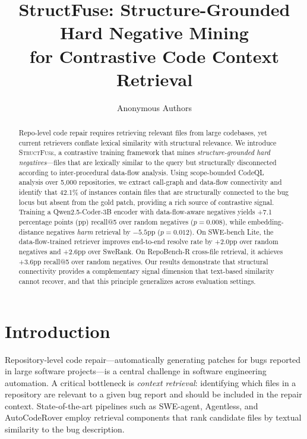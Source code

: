 \documentclass[11pt]{article}
\title{StructFuse: Structure-Grounded Hard Negative Mining\\for Contrastive Code Context Retrieval}
\author{
  Anonymous Authors
}
\date{}
\begin{document}
\maketitle

\begin{abstract}
Repo-level code repair requires retrieving relevant files from large codebases, yet current retrievers conflate lexical similarity with structural relevance.
We introduce \textsc{StructFuse}, a contrastive training framework that mines \emph{structure-grounded hard negatives}---files that are lexically similar to the query but structurally disconnected according to inter-procedural data-flow analysis.
Using scope-bounded CodeQL analysis over 5{,}000 repositories, we extract call-graph and data-flow connectivity and identify that 42.1\% of instances contain files that are structurally connected to the bug locus but absent from the gold patch, providing a rich source of contrastive signal.
Training a Qwen2.5-Coder-3B encoder with data-flow-aware negatives yields +7.1 percentage points (pp) recall@5 over random negatives ($p{=}0.008$), while embedding-distance negatives \emph{harm} retrieval by $-5.5$pp ($p{=}0.012$).
On SWE-bench Lite, the data-flow-trained retriever improves end-to-end resolve rate by +2.0pp over random negatives and +2.6pp over SweRank.
On RepoBench-R cross-file retrieval, it achieves +3.6pp recall@5 over random negatives.
Our results demonstrate that structural connectivity provides a complementary signal dimension that text-based similarity cannot recover, and that this principle generalizes across evaluation settings.
\end{abstract}

\section{Introduction}
\label{sec:intro}

Repository-level code repair---automatically generating patches for bugs reported in large software projects---is a central challenge in software engineering automation.
A critical bottleneck is \emph{context retrieval}: identifying which files in a repository are relevant to a given bug report and should be included in the repair context.
State-of-the-art pipelines such as SWE-agent, Agentless, and AutoCodeRover employ retrieval components that rank candidate files by textual similarity to the bug description.
\end{document}
